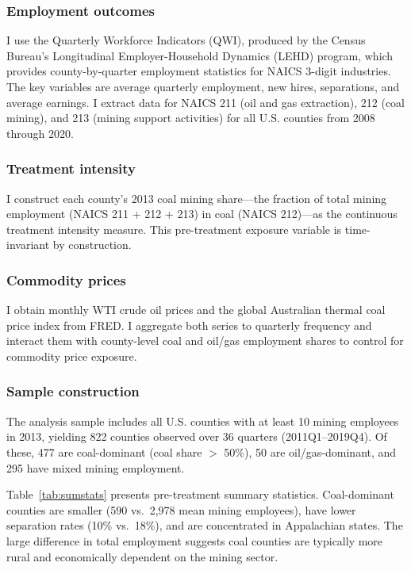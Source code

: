 \documentclass[12pt]{article}
\begin{document}
\subsubsection*{Employment outcomes} I use the Quarterly Workforce Indicators (QWI), produced by the Census Bureau's Longitudinal Employer-Household Dynamics (LEHD) program, which provides county-by-quarter employment statistics for NAICS 3-digit industries. The key variables are average quarterly employment, new hires, separations, and average earnings. I extract data for NAICS 211 (oil and gas extraction), 212 (coal mining), and 213 (mining support activities) for all U.S. counties from 2008 through 2020.

\subsubsection*{Treatment intensity} I construct each county's 2013 coal mining share---the fraction of total mining employment (NAICS 211 + 212 + 213) in coal (NAICS 212)---as the continuous treatment intensity measure. This pre-treatment exposure variable is time-invariant by construction.

\subsubsection*{Commodity prices} I obtain monthly WTI crude oil prices and the global Australian thermal coal price index from FRED. I aggregate both series to quarterly frequency and interact them with county-level coal and oil/gas employment shares to control for commodity price exposure.

\subsubsection*{Sample construction} The analysis sample includes all U.S. counties with at least 10 mining employees in 2013, yielding 822 counties observed over 36 quarters (2011Q1--2019Q4). Of these, 477 are coal-dominant (coal share $>$ 50\%), 50 are oil/gas-dominant, and 295 have mixed mining employment.

Table~\ref{tab:sumstats} presents pre-treatment summary statistics. Coal-dominant counties are smaller (590 vs.\ 2,978 mean mining employees), have lower separation rates (10\% vs.\ 18\%), and are concentrated in Appalachian states. The large difference in total employment suggests coal counties are typically more rural and economically dependent on the mining sector.
\end{document}
